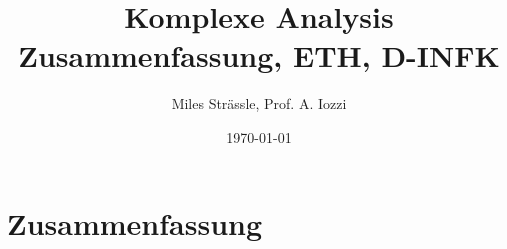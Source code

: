 \documentclass[11pt]{article}
\begin{document}
	
\setcounter{page}{1}
\setcounter{tocdepth}{2}


\title{Komplexe Analysis Zusammenfassung, ETH, D-INFK}
\author{Miles Strässle, Prof. A. Iozzi}
\date{\today}
\maketitle


% 




\part{Zusammenfassung}





\newpage

\end{document}
